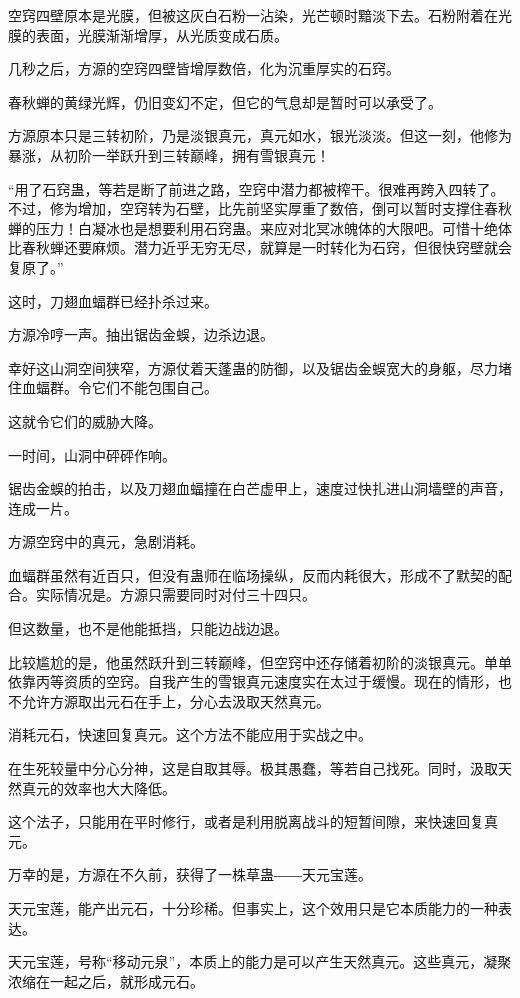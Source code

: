 \begin{this_body}
空窍四壁原本是光膜，但被这灰白石粉一沾染，光芒顿时黯淡下去。石粉附着在光膜的表面，光膜渐渐增厚，从光质变成石质。

几秒之后，方源的空窍四壁皆增厚数倍，化为沉重厚实的石窍。

春秋蝉的黄绿光辉，仍旧变幻不定，但它的气息却是暂时可以承受了。

方源原本只是三转初阶，乃是淡银真元，真元如水，银光淡淡。但这一刻，他修为暴涨，从初阶一举跃升到三转巅峰，拥有雪银真元！

“用了石窍蛊，等若是断了前进之路，空窍中潜力都被榨干。很难再跨入四转了。不过，修为增加，空窍转为石壁，比先前坚实厚重了数倍，倒可以暂时支撑住春秋蝉的压力！白凝冰也是想要利用石窍蛊。来应对北冥冰魄体的大限吧。可惜十绝体比春秋蝉还要麻烦。潜力近乎无穷无尽，就算是一时转化为石窍，但很快窍壁就会复原了。”

这时，刀翅血蝠群已经扑杀过来。

方源冷哼一声。抽出锯齿金蜈，边杀边退。

幸好这山洞空间狭窄，方源仗着天蓬蛊的防御，以及锯齿金蜈宽大的身躯，尽力堵住血蝠群。令它们不能包围自己。

这就令它们的威胁大降。

一时间，山洞中砰砰作响。

锯齿金蜈的拍击，以及刀翅血蝠撞在白芒虚甲上，速度过快扎进山洞墙壁的声音，连成一片。

方源空窍中的真元，急剧消耗。

血蝠群虽然有近百只，但没有蛊师在临场操纵，反而内耗很大，形成不了默契的配合。实际情况是。方源只需要同时对付三十四只。

但这数量，也不是他能抵挡，只能边战边退。

比较尴尬的是，他虽然跃升到三转巅峰，但空窍中还存储着初阶的淡银真元。单单依靠丙等资质的空窍。自我产生的雪银真元速度实在太过于缓慢。现在的情形，也不允许方源取出元石在手上，分心去汲取天然真元。

消耗元石，快速回复真元。这个方法不能应用于实战之中。

在生死较量中分心分神，这是自取其辱。极其愚蠢，等若自己找死。同时，汲取天然真元的效率也大大降低。

这个法子，只能用在平时修行，或者是利用脱离战斗的短暂间隙，来快速回复真元。

万幸的是，方源在不久前，获得了一株草蛊――天元宝莲。

天元宝莲，能产出元石，十分珍稀。但事实上，这个效用只是它本质能力的一种表达。

天元宝莲，号称“移动元泉”，本质上的能力是可以产生天然真元。这些真元，凝聚浓缩在一起之后，就形成元石。


\end{this_body}
